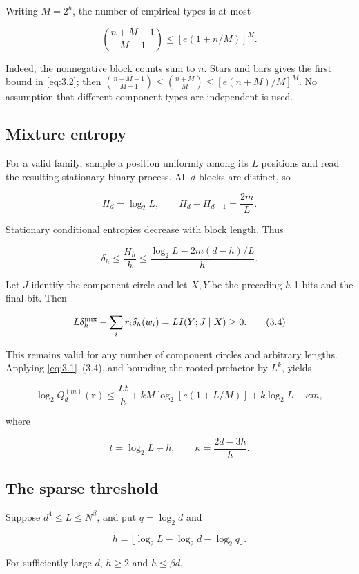 \documentclass[11pt]{article}
\theoremstyle{remark}
\begin{document}
Writing \(M=2^h\), the number of empirical types is at most

\[
 \binom{n+M-1}{M-1}\le[e(1+n/M)]^M.
 \tag{3.2}\label{eq:3.2}
\]

Indeed, the nonnegative block counts sum to \(n\). Stars and bars gives
the first bound in \eqref{eq:3.2}; then
\(\binom{n+M-1}{M-1}\le\binom{n+M}{M}\le[e(n+M)/M]^M\). No assumption
that different component types are independent is used.

\subsection{Mixture entropy}\label{mixture-entropy}

For a valid family, sample a position uniformly among its \(L\)
positions and read the resulting stationary binary process. All
\(d\)-blocks are distinct, so

\[
 H_d=\log_2L,\qquad H_d-H_{d-1}=\frac{2m}{L}.
\]

Stationary conditional entropies decrease with block length. Thus

\[
 \delta_h\le\frac{H_h}{h}
 \le\frac{\log_2L-2m(d-h)/L}{h}.
 \tag{3.3}\label{eq:3.3}
\]

Let \(J\) identify the component circle and let \(X,Y\) be the
preceding \(h\)-1 bits and the final bit. Then

\[
 L\delta_h^{\rm mix}-\sum_i r_i\delta_h(w_i)
 =L I(Y;J\mid X)\ge0.
 \tag{3.4}\label{eq:3.4}
\]

This remains valid for any number of component circles and arbitrary
lengths. Applying \eqref{eq:3.1}--(3.4), and bounding the rooted prefactor by
\(L^k\), yields

\[
 \log_2Q_d^{(m)}(\mathbf r)
 \le \frac{Lt}{h}
 +kM\log_2[e(1+L/M)]+k\log_2L-\kappa m,
 \tag{3.5}\label{eq:3.5}
\]

where

\[
 t=\log_2L-h,\qquad \kappa=\frac{2d-3h}{h}.
\]

\subsection{The sparse threshold}\label{the-sparse-threshold}

Suppose \(d^4\le L\le N^\beta\), and put \(q=\log_2d\) and

\[
 h=\lfloor\log_2L-\log_2d-\log_2q\rfloor.
\]

For sufficiently large \(d\), \(h\ge2\) and \(h\le\beta d\),
\end{document}
